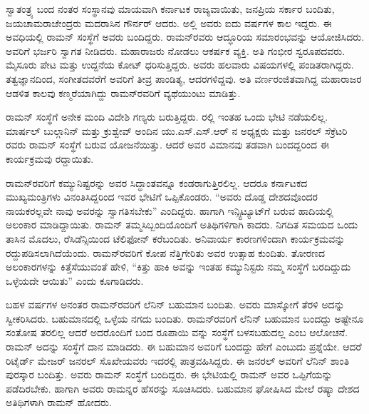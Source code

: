 ಸ್ವಾತಂತ್ರ್ಯ ಬಂದ ನಂತರ ಸಂಸ್ಥಾನವು ಮಾಯವಾಗಿ ಕರ್ನಾಟಕ ರಾಜ್ಯವಾಯಿತು, ಜನಪ್ರಿಯ ಸರ್ಕಾರ ಬಂದಿತು, ಜಯಚಾಮರಾಜೇಂದ್ರರು ಮದರಾಸಿನ ಗೌರ್ನರ್ ಆದರು. ಅಲ್ಲಿ ಅವರು ಐದು ವರ್ಷಗಳ ಕಾಲ ಇದ್ದರು. ಈ ಅವಧಿಯಲ್ಲಿ ರಾಮನ್ ಸಂಸ್ಥೆಗೆ ಅವರು ಬಂದಿದ್ದರು. ರಾಮನ್‍ರವರು ಆದ್ಧೂರಿಯ ಸಮಾರಂಭವನ್ನು ಆಯೋಜಿಸಿದರು. ಅವರಿಗೆ ಭರ್ಜರಿ ಸ್ವಾಗತ ನೀಡಿದರು. ಮಹಾರಾಜರು ನೋಡಲು ಆಕರ್ಷಕ ವ್ಯಕ್ತಿ. ಅತಿ ಗಂಭೀರ ಸ್ವರೂಪದವರು. ಮೈಸೂರು ಪೇಟ ಮತ್ತು ಉದ್ದನೆಯ ಕೋಟ್ ಧರಿಸುತ್ತಿದ್ದರು. ಅವರು ಹಲವಾರು ವಿಷಯಗಳಲ್ಲಿ ಪಂಡಿತರಾಗಿದ್ದರು. ತತ್ವಜ್ಞಾನದಿಂದ, ಸಂಗೀತದವರೆಗೆ ಅವರಿಗೆ ತೀವ್ರ ಪಾಂಡಿತ್ಯ, ಆದರಗಳಿದ್ದವು. ಅತಿ ವರ್ಣರಂಜಿತವಾಗಿದ್ದ ಮಹಾರಾಜರ ಆಡಳಿತ ಕಾಲವು ಕಣ್ಮರೆಯಾಗಿದ್ದು ರಾಮನ್‍ರವರಿಗೆ ವ್ಯಥೆಯುಂಟು ಮಾಡಿತ್ತು.



ರಾಮನ್ ಸಂಸ್ಥೆಗೆ ಅನೇಕ ಮಂದಿ ವಿದೇಶಿ ಗಣ್ಯರು ಬರುತ್ತಿದ್ದರು. ರಲ್ಲಿ ಇಂತಹ ಒಂದು ಭೇಟಿ ನಡೆಯಲಿಲ್ಲ. ಮಾರ್ಷಲ್ ಬುಲ್ಗಾನಿನ್ ಮತ್ತು ಕ್ರುಶ್ವೇವ್ ಅಂದಿನ ಯು.ಎಸ್.ಎಸ್.ಆರ್ ನ ಅಧ್ಯಕ್ಷರು ಮತ್ತು ಜನರಲ್ ಸೆಕ್ರೆಟರಿ ರವರು ರಾಮನ್ ಸಂಸ್ಥೆಗೆ ಬರುವ ಯೋಜನೆಯಿತ್ತು. ಆದರೆ ಅವರ ವಿಮಾನವು ತಡವಾಗಿ ಬಂದದ್ದರಿಂದ ಈ ಕಾರ್ಯಕ್ರಮವು ರದ್ದಾಯಿತು.

\newpage

ರಾಮನ್‍ರವರಿಗೆ ಕಮ್ಯುನಿಷ್ಟರನ್ನು ಅವರ ಸಿದ್ಧಾಂತವನ್ನೂ ಕಂಡರಾಗುತ್ತಿರಲಿಲ್ಲ. ಆದರೂ ಕರ್ನಾಟಕದ ಮುಖ್ಯಮಂತ್ರಿಗಳು ವಿನಂತಿಸಿದ್ದರಿಂದ ಇವರ ಭೇಟಿಗೆ ಒಪ್ಪಿಕೊಂಡರು. “ಅವರು ದೊಡ್ಡ ದೇಶದವೊಂದರ ನಾಯಕರಲ್ಲವೇ ನಾವು ಅವರನ್ನು ಸ್ವಾಗತಿಸಬೇಕು” ಎಂದಿದ್ದರು. ಹಾಗಾಗಿ ಇನ್ಸ್ಟಿಟ್ಯೂಟ್‍ಗೆ ಬರುವ ಹಾದಿಯಲ್ಲಿ ಅಲಂಕಾರ ಮಾಡಿದ್ದಾಯಿತು. ರಾಮನ್ ತಮ್ಮ\break ಸಿಬ್ಬಂದಿಯೊಂದಿಗೆ ಅತಿಥಿಗಳಿಗಾಗಿ ಕಾದರು. ನಿಗದಿತ ಸಮಯದ ಒಂದು ತಾಸಿನ ಮೊದಲು, ರೆಸಿಡೆನ್ಸಿಯಿಂದ ಟೆಲಿಫೋನ್ ಕರೆಬಂದಿತು. ಅನಿವಾರ್ಯ ಕಾರಣಗಳಿಂದಾಗಿ ಕಾರ್ಯಕ್ರಮವನ್ನು ರದ್ದುಪಡಿಸಲಾಗಿದೆಯೆಂದು. ರಾಮನ್‍ರವರಿಗೆ ಕೋಪ ನೆತ್ತಿಗೇರಿತು ಅವರ ಉತ್ಸಾಹ ಕುಂದಿತು. ತೋರಣದ ಅಲಂಕಾರಗಳನ್ನು ಕಿತ್ತೆಸೆಯುವಂತೆ ಹೇಳಿ, “ಕಿತ್ತು ಹಾಕಿ ಅವನ್ನು ಇಂತಹ ಕಮ್ಯುನಿಸ್ಟರು ನಮ್ಮ ಸಂಸ್ಥೆಗೆ ಬರದಿದ್ದುದು ಒಳ್ಳೆಯದೇ ಆಯಿತು” ಎಂದು ಕೂಗಾಡಿದರು.

ಬಹಳ ವರ್ಷಗಳ ಅನಂತರ ರಾಮನ್‍ರವರಿಗೆ ಲೆನಿನ್ ಬಹುಮಾನ ಬಂದಿತು. ಅವರು ಮಾಸ್ಕೋಗೆ ತೆರಳಿ ಅದನ್ನು ಸ್ವೀಕರಿಸಿದರು. ಬಹುಮಾನದಲ್ಲಿ ಒಳ್ಳೆಯ ನಗದು ಬಂದಿತು. ರಾಮನ್‍ರವರಿಗೆ ಲೆನಿನ್ ಬಹುಮಾನ ಬಂದದ್ದು ಅಷ್ಟೇನೂ ಸಂತೋಷ ತರಲಿಲ್ಲ ಆದರೆ ಅದರೊಂದಿಗೆ ಬಂದ ರೂಪಾಯಿ  ವನ್ನು ಸಂಸ್ಥೆಗೆ ಬಳಸಬಹುದಲ್ಲ ಎಂಬ ಆಲೋಚನೆ. ರಾಮನ್ ಅದನ್ನು ಸಂಸ್ಥೆಗೆ ದಾನ ಮಾಡಿದರು. ಈ ಬಹುಮಾನ ಅವರಿಗೆ ಬಂದದ್ದು ಹೇಗೆ ಎಂಬುದು ಪ್ರಶ್ನೆಯೇ. ಆದರೆ ರಿಟೈರ್ಡ್ ಮೇಜರ್ ಜನರಲ್ ಸೊಖೇಯವರು ಇದರಲ್ಲಿ ಪಾತ್ರವಹಿಸಿದ್ದರು. ಈ ಜನರಲ್ ಅವರಿಗೆ ಲೆನಿನ್ ಶಾಂತಿ ಪುರಸ್ಕಾರ ಬಂದಿತ್ತು. ಅವರು ರಾಮನ್ ಸಂಸ್ಥೆಗೆ ಬಂದಿದ್ದರು. ಈ ಭೇಟಿಯಲ್ಲಿ ರಾಮನ್ ಅವರ ಒಪ್ಪಿಗೆಯನ್ನು ಪಡೆದಿರಬೇಕು. ಹಾಗಾಗಿ ಅವರು ರಾಮನ್ನರ ಹೆಸರನ್ನು ಸೂಚಿಸಿದರು. ಬಹುಮಾನ ಘೋಷಿಸಿದ ಮೇಲೆ ರಷ್ಯಾ ದೇಶದ ಅತಿಥಿಗಳಾಗಿ ರಾಮನ್ ಹೋದರು.

